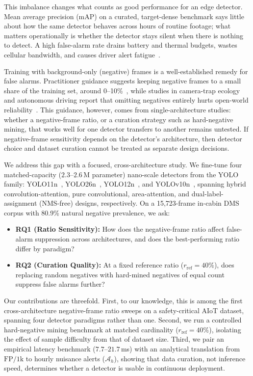\documentclass[conference]{IEEEtran}
\begin{document}
This imbalance changes what counts as good performance for an edge detector. Mean average precision (mAP) on a curated, target-dense benchmark says little about how the same detector behaves across hours of routine footage; what matters operationally is whether the detector stays silent when there is nothing to detect. A high false-alarm rate drains battery and thermal budgets, wastes cellular bandwidth, and causes driver alert fatigue~\cite{b12,b13}.

Training with background-only (negative) frames is a well-established remedy for false alarms. Practitioner guidance suggests keeping negative frames to a small share of the training set, around 0--10\%~\cite{b8}, while studies in camera-trap ecology and autonomous driving report that omitting negatives entirely hurts open-world reliability~\cite{b5,b6}. This guidance, however, comes from single-architecture studies: whether a negative-frame ratio, or a curation strategy such as hard-negative mining, that works well for one detector transfers to another remains untested. If negative-frame sensitivity depends on the detector's architecture, then detector choice and dataset curation cannot be treated as separate design decisions.

We address this gap with a focused, cross-architecture study. We fine-tune four matched-capacity ($2.3$--$2.6$\,M parameter) nano-scale detectors from the YOLO family: YOLO11n~\cite{b9}, YOLO26n~\cite{b10}, YOLO12n~\cite{b11}, and YOLOv10n~\cite{b20}, spanning hybrid convolution-attention, pure convolutional, area-attention, and dual-label-assignment (NMS-free) designs, respectively. On a 15,723-frame in-cabin DMS corpus with 80.9\% natural negative prevalence, we ask:

\begin{itemize}
\item \textbf{RQ1 (Ratio Sensitivity):} How does the negative-frame ratio affect false-alarm suppression across architectures, and does the best-performing ratio differ by paradigm?
\item \textbf{RQ2 (Curation Quality):} At a fixed reference ratio ($r_{\mathrm{ref}} = 40\%$), does replacing random negatives with hard-mined negatives of equal count suppress false alarms further?
\end{itemize}

Our contributions are threefold. First, to our knowledge, this is among the first cross-architecture negative-frame ratio sweeps on a safety-critical AIoT dataset, spanning four detector paradigms rather than one. Second, we run a controlled hard-negative mining benchmark at matched cardinality ($r_{\mathrm{ref}} = 40\%$), isolating the effect of sample difficulty from that of dataset size. Third, we pair an empirical latency benchmark ($7.7$--$21.7$\,ms) with an analytical translation from $\mathrm{FP/1k}$ to hourly nuisance alerts ($\mathcal{A}_h$), showing that data curation, not inference speed, determines whether a detector is usable in continuous deployment.
\end{document}
